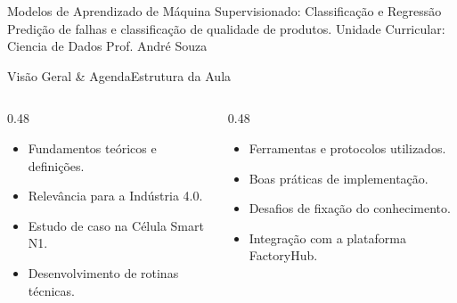 
\senaicover
  {Modelos de Aprendizado de Máquina Supervisionado: Classificação e Regressão}
  {Predição de falhas e classificação de qualidade de produtos.}
  {Unidade Curricular: Ciencia de Dados}
  {Prof. André Souza}

\begin{senaiframe}{Visão Geral \& Agenda}{Estrutura da Aula}
  \begin{columns}[t]
    \begin{column}{0.48\textwidth}
      \begin{tcolorbox}[senaibluecard, title={1. Conceitos Chave}]
        \begin{itemize}
          \item Fundamentos teóricos e definições.
          \item Relevância para a Indústria 4.0.
        \end{itemize}
      \end{tcolorbox}
      \vspace{4pt}
      \begin{tcolorbox}[senaiambercard, title={3. Aplicação Prática}]
        \begin{itemize}
          \item Estudo de caso na Célula Smart N1.
          \item Desenvolvimento de rotinas técnicas.
        \end{itemize}
      \end{tcolorbox}
    \end{column}
    \begin{column}{0.48\textwidth}
      \begin{tcolorbox}[senairedcard, title={2. Detalhamento Técnico}]
        \begin{itemize}
          \item Ferramentas e protocolos utilizados.
          \item Boas práticas de implementação.
        \end{itemize}
      \end{tcolorbox}
      \vspace{4pt}
      \begin{tcolorbox}[senaigreencard, title={4. Exercícios \& Avaliação}]
        \begin{itemize}
          \item Desafios de fixação do conhecimento.
          \item Integração com a plataforma FactoryHub.
        \end{itemize}
      \end{tcolorbox}
    \end{column}
  \end{columns}
\end{senaiframe}

